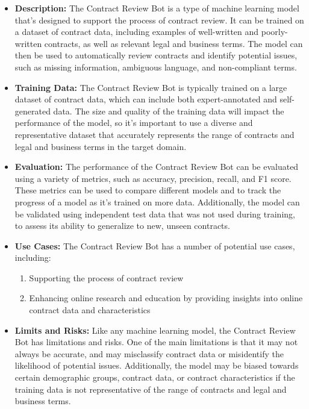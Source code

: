\begin{itemize}
    \item \textbf{Description:} The Contract Review Bot is a type of machine learning model that's designed to support the process of contract review. It can be trained on a dataset of contract data, including examples of well-written and poorly-written contracts, as well as relevant legal and business terms. The model can then be used to automatically review contracts and identify potential issues, such as missing information, ambiguous language, and non-compliant terms.
    \item \textbf{Training Data:} The Contract Review Bot is typically trained on a large dataset of contract data, which can include both expert-annotated and self-generated data. The size and quality of the training data will impact the performance of the model, so it's important to use a diverse and representative dataset that accurately represents the range of contracts and legal and business terms in the target domain.
    \item \textbf{Evaluation:} The performance of the Contract Review Bot can be evaluated using a variety of metrics, such as accuracy, precision, recall, and F1 score. These metrics can be used to compare different models and to track the progress of a model as it's trained on more data. Additionally, the model can be validated using independent test data that was not used during training, to assess its ability to generalize to new, unseen contracts.
    \item \textbf{Use Cases:} The Contract Review Bot has a number of potential use cases, including:
        \begin{enumerate}  
            \item Supporting the process of contract review
            \item Enhancing online research and education by providing insights into online contract data and characteristics
        \end{enumerate}
    \item \textbf{Limits and Risks:} Like any machine learning model, the Contract Review Bot has limitations and risks. One of the main limitations is that it may not always be accurate, and may misclassify contract data or misidentify the likelihood of potential issues. Additionally, the model may be biased towards certain demographic groups, contract data, or contract characteristics if the training data is not representative of the range of contracts and legal and business terms.

\end{itemize}

